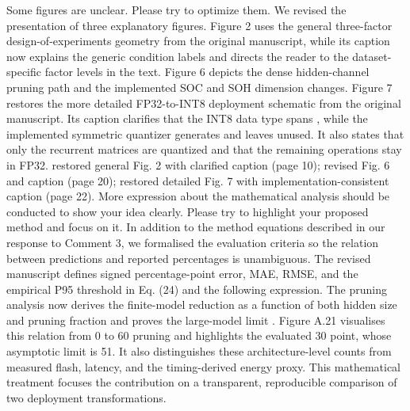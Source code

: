 {}
\markdownRendererSectionEnd \markdownRendererSectionBegin
{}\markdownRendererInterblockSeparator
{}\markdownRendererBlockQuoteBegin
Some figures are unclear. Please try to optimize them.\markdownRendererBlockQuoteEnd \markdownRendererInterblockSeparator
{} We revised the presentation of three explanatory figures. Figure 2 uses the general three-factor design-of-experiments geometry from the original manuscript, while its caption now explains the generic condition labels and directs the reader to the dataset-specific factor levels in the text. Figure 6 depicts the dense hidden-channel pruning path and the implemented SOC and SOH dimension changes. Figure 7 restores the more detailed FP32-to-INT8 deployment schematic from the original manuscript. Its caption clarifies that the INT8 data type spans , while the implemented symmetric quantizer generates  and leaves  unused. It also states that only the recurrent matrices are quantized and that the remaining operations stay in FP32.\markdownRendererParagraphSeparator
{} restored general Fig. 2 with clarified caption (page 10); revised Fig. 6 and caption (page 20); restored detailed Fig. 7 with implementation-consistent caption (page 22).\markdownRendererInterblockSeparator
{}
\markdownRendererSectionEnd \markdownRendererSectionBegin
{}\markdownRendererInterblockSeparator
{}\markdownRendererBlockQuoteBegin
More expression about the mathematical analysis should be conducted to show your idea clearly. Please try to highlight your proposed method and focus on it.\markdownRendererBlockQuoteEnd \markdownRendererInterblockSeparator
{} In addition to the method equations described in our response to Comment 3, we formalised the evaluation criteria so the relation between predictions and reported percentages is unambiguous. The revised manuscript defines signed percentage-point error, MAE, RMSE, and the empirical P95 threshold in Eq. (24) and the following expression. The pruning analysis now derives the finite-model reduction as a function of both hidden size and pruning fraction and proves the large-model limit . Figure A.21 visualises this relation from 0\markdownRendererPercentSign{} to 60\markdownRendererPercentSign{} pruning and highlights the evaluated 30\markdownRendererPercentSign{} point, whose asymptotic limit is 51\markdownRendererPercentSign{}. It also distinguishes these architecture-level counts from measured flash, latency, and the timing-derived energy proxy. This mathematical treatment focuses the contribution on a transparent, reproducible comparison of two deployment transformations.\markdownRendererParagraphSeparator
